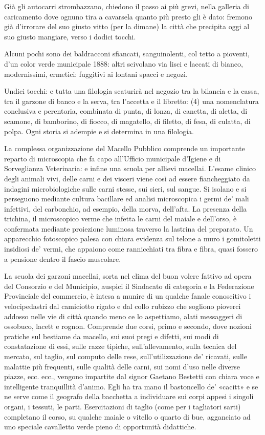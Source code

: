 Già gli autocarri strombazzano, chiedono il passo ai più grevi, nella galleria di caricamento dove ognuno tira a cavarsela quanto più presto gli è dato: fremono già d’irrorare del suo giusto vitto (per la dimane) la città che precipita oggi al suo giusto mangiare, verso i dodici tocchi.

Alcuni pochi sono dei baldracconi sfiancati, sanguinolenti, col tetto a pioventi, d’un color verde municipale 1888: altri scivolano via lisci e laccati di bianco, modernissimi, ermetici: fuggitivi ai lontani spacci e negozi.

Undici tocchi: e tutta una filologia scaturirà nel negozio tra la bilancia e la cassa, tra il garzone di banco e la serva, tra l’accetta e il libretto: (4) una nomenclatura conclusiva e perentoria, combinata di punta, di lonza, di canetta, di aletta, di scamone, di bamborino, di fiocco, di magatello, di filetto, di fesa, di culatta, di polpa. Ogni storia si adempie e si determina in una filologia.

La complessa organizzazione del Macello Pubblico comprende un importante reparto di microscopia che fa capo all’Ufficio municipale d’Igiene e di Sorveglianza Veterinaria: e infine una scuola per allievi macellai. L’esame clinico degli animali vivi, delle carni e dei visceri viene così ad essere fiancheggiato da indagini microbiologiche sulle carni stesse, sui sieri, sul sangue. Si isolano e si perseguono mediante cultura bacillare ed analisi microscopica i germi de’ mali infettivi, del carbonchio, ad esempio, della morva, dell’afta. La presenza della trichina, il microscopico verme che infetta le carni del maiale e dell’orso, è confermata mediante proiezione luminosa traverso la lastrina del preparato. Un apparecchio fotoscopico palesa con chiara evidenza sul telone a muro i gomitoletti insidiosi de’ vermi, che appaiono come rannicchiati tra fibra e fibra, quasi fossero a pensione dentro il fascio muscolare.

La scuola dei garzoni macellai, sorta nel clima del buon volere fattivo ad opera del Consorzio e del Municipio, auspici il Sindacato di categoria e la Federazione Provinciale del commercio, è intesa a munire di un qualche fanale conoscitivo i velocipedastri dal camiciotto rigato e dal collo rubizzo che sogliono pioverci addosso nelle vie di città quando meno ce lo aspettiamo, alati messaggeri di ossobuco, lacett e rognon. Comprende due corsi, primo e secondo, dove nozioni pratiche sul bestiame da macello, sui suoi pregi e difetti, sui modi di constatazione di essi, sulle razze tipiche, sull’allevamento, sulla tecnica del mercato, sul taglio, sul computo delle rese, sull’utilizzazione de’ ricavati, sulle malattie più frequenti, sulle qualità delle carni, sui nomi d’uso nelle diverse piazze, ecc. ecc., vengono impartite dal signor Gaetano Bestetti con chiara voce e intelligente tranquillità d’animo. Egli ha tra mano il bastoncello de’ «cacitt» e se ne serve come il geografo della bacchetta a individuare sui corpi appesi i singoli organi, i tessuti, le parti. Esercitazioni di taglio (come per i tagliatori sarti) completano il corso, su qualche maiale o vitello o quarto di bue, agganciato ad uno speciale cavalletto verde pieno di opportunità didattiche.

